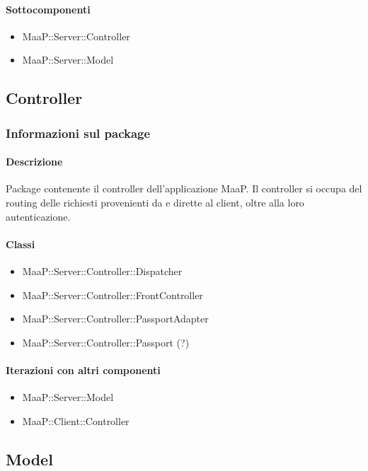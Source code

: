 \paragraph{Sottocomponenti}
\begin{itemize}
\item MaaP::Server::Controller
\item MaaP::Server::Model
\end{itemize}

\subsection{Controller}
\subsubsection{Informazioni sul package}
\paragraph{Descrizione}
Package contenente il controller dell'applicazione MaaP. Il controller si occupa del routing delle richiesti provenienti da e dirette al client, oltre alla loro autenticazione.


\paragraph{Classi}
\begin{itemize}
\item MaaP::Server::Controller::Dispatcher
\item MaaP::Server::Controller::FrontController
\item MaaP::Server::Controller::PassportAdapter
\item MaaP::Server::Controller::Passport (?)
\end{itemize}

\paragraph{Iterazioni con altri componenti}
\begin{itemize}
\item MaaP::Server::Model
\item MaaP::Client::Controller
\end{itemize}

\subsection{Model}
